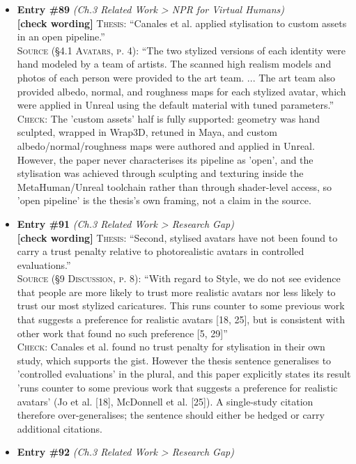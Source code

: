 \documentclass[11pt, a4paper]{article}
\begin{document}
\begin{itemize}[leftmargin=1.2em,itemsep=4pt]
\item \textbf{Entry \#89} \textit{(Ch.3 Related Work > NPR for Virtual Humans)}\\
\textcolor{partialorange}{\textbf{[check wording]}} \textsc{Thesis:} ``Canales et al. applied stylisation to custom assets in an open pipeline.''\\
\textsc{Source (§4.1 Avatars, p. 4):} ``The two stylized versions of each identity were hand modeled by a team of artists. The scanned high realism models and photos of each person were provided to the art team. ... The art team also provided albedo, normal, and roughness maps for each stylized avatar, which were applied in Unreal using the default material with tuned parameters.''\\
\textsc{Check:} The 'custom assets' half is fully supported: geometry was hand sculpted, wrapped in Wrap3D, retuned in Maya, and custom albedo/normal/roughness maps were authored and applied in Unreal. However, the paper never characterises its pipeline as 'open', and the stylisation was achieved through sculpting and texturing inside the MetaHuman/Unreal toolchain rather than through shader-level access, so 'open pipeline' is the thesis's own framing, not a claim in the source.
\item \textbf{Entry \#91} \textit{(Ch.3 Related Work > Research Gap)}\\
\textcolor{partialorange}{\textbf{[check wording]}} \textsc{Thesis:} ``Second, stylised avatars have not been found to carry a trust penalty relative to photorealistic avatars in controlled evaluations.''\\
\textsc{Source (§9 Discussion, p. 8):} ``With regard to Style, we do not see evidence that people are more likely to trust more realistic avatars nor less likely to trust our most stylized caricatures. This runs counter to some previous work that suggests a preference for realistic avatars [18, 25], but is consistent with other work that found no such preference [5, 29]''\\
\textsc{Check:} Canales et al. found no trust penalty for stylisation in their own study, which supports the gist. However the thesis sentence generalises to 'controlled evaluations' in the plural, and this paper explicitly states its result 'runs counter to some previous work that suggests a preference for realistic avatars' (Jo et al. [18], McDonnell et al. [25]). A single-study citation therefore over-generalises; the sentence should either be hedged or carry additional citations.
\item \textbf{Entry \#92} \textit{(Ch.3 Related Work > Research Gap)}\\

\end{itemize}
\end{document}
